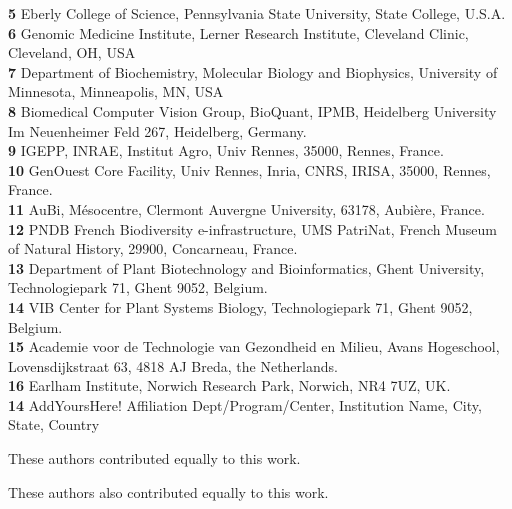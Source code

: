 \documentclass[10pt,letterpaper]{article}
\begin{document}
\begin{flushleft}
\textbf{5} Eberly College of Science, Pennsylvania State University, State College, U.S.A. \\
\textbf{6} Genomic Medicine Institute, Lerner Research Institute, Cleveland Clinic, Cleveland, OH, USA  \\
\textbf{7} Department of Biochemistry, Molecular Biology and Biophysics, University of Minnesota, Minneapolis, MN, USA  \\
\textbf{8} Biomedical Computer Vision Group, BioQuant, IPMB, Heidelberg University\\ Im Neuenheimer Feld 267, Heidelberg, Germany. \\
\textbf{9} IGEPP, INRAE, Institut Agro, Univ Rennes, 35000, Rennes, France.\\
\textbf{10} GenOuest Core Facility, Univ Rennes, Inria, CNRS, IRISA, 35000, Rennes, France.\\
\textbf{11} AuBi, Mésocentre, Clermont Auvergne University, 63178, Aubière, France.\\
\textbf{12} PNDB French Biodiversity e-infrastructure, UMS PatriNat, French Museum of Natural History, 29900, Concarneau, France.\\
\textbf{13} Department of Plant Biotechnology and Bioinformatics, Ghent University, Technologiepark 71, Ghent 9052, Belgium.\\
\textbf{14} VIB Center for Plant Systems Biology, Technologiepark 71, Ghent 9052, Belgium.\\
\textbf{15} Academie voor de Technologie van Gezondheid en Milieu, Avans Hogeschool, Lovensdijkstraat 63, 4818 AJ Breda, the Netherlands.\\
\textbf{16} Earlham Institute, Norwich Research Park, Norwich, NR4 7UZ, UK.\\
\color{blue}\textbf{14} AddYoursHere! Affiliation Dept/Program/Center, Institution Name, City, State, Country \color{black}\\
\bigskip

%
%
\Yinyang These authors contributed equally to this work.

\ddag These authors also contributed equally to this work.


\end{flushleft}
\end{document}
